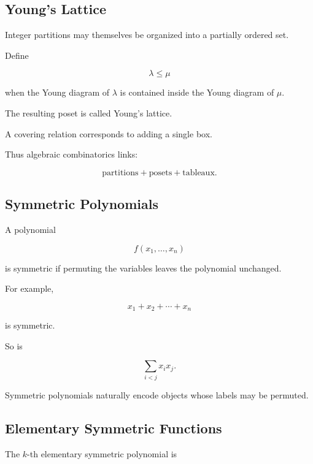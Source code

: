 \subsection{Young's Lattice}
\label{subsec:youngs-lattice}

Integer partitions may themselves be organized into a partially ordered
set.

Define

\[
\lambda\leq\mu
\]

when the Young diagram of \(\lambda\) is contained inside the Young
diagram of \(\mu\).

The resulting poset is called Young's lattice.

A covering relation corresponds to adding a single box.

Thus algebraic combinatorics links:

\[
\boxed{
\text{partitions}
+
\text{posets}
+
\text{tableaux}.
}
\]

\subsection{Symmetric Polynomials}
\label{subsec:symmetric-polynomials}

A polynomial

\[
f(x_1,\ldots,x_n)
\]

is symmetric if permuting the variables leaves the polynomial unchanged.

For example,

\[
x_1+x_2+\cdots+x_n
\]

is symmetric.

So is

\[
\sum_{i<j}x_ix_j.
\]

Symmetric polynomials naturally encode objects whose labels may be
permuted.

\subsection{Elementary Symmetric Functions}
\label{subsec:elementary-symmetric-functions}

The \(k\)-th elementary symmetric polynomial is

